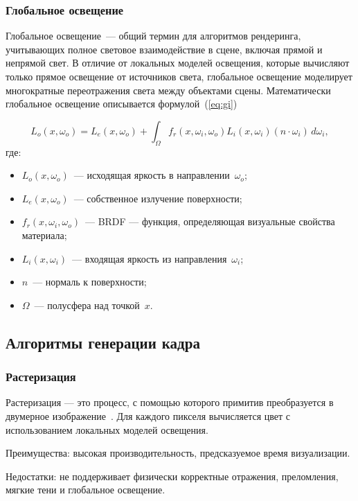 \subsubsection{Глобальное освещение}

Глобальное освещение~--- общий термин для алгоритмов рендеринга,
учитывающих полное световое взаимодействие в сцене,
включая прямой и непрямой свет.
В отличие от локальных моделей освещения, которые вычисляют только прямое освещение от источников света, глобальное освещение моделирует многократные переотражения света между объектами сцены.
Математически~\cite{GI-formula} глобальное освещение описывается формулой~(\ref{eq:gi})

\begin{equation}
    \label{eq:gi}
L_o(x, \omega_o) = L_e(x, \omega_o) + \int_{\Omega} f_r(x, \omega_i, \omega_o) L_i(x, \omega_i) (n \cdot \omega_i) \, d\omega_i,
\end{equation}
\noindent где:
\begin{itemize}
    \item $L_o(x, \omega_o)$~--- исходящая яркость в направлении~$\omega_o$;
    \item $L_e(x, \omega_o)$~--- собственное излучение поверхности;
    \item $f_r(x, \omega_i, \omega_o)$~--- BRDF --- функция, определяющая визуальные свойства материала;
    \item $L_i(x, \omega_i)$~--- входящая яркость из направления~$\omega_i$;
    \item $n$~--- нормаль к поверхности;
    \item $\Omega$~--- полусфера над точкой~$x$.
\end{itemize}

\subsection{Алгоритмы генерации кадра}
\subsubsection{Растеризация}

Растеризация --- это процесс, с помощью которого примитив преобразуется в двумерное изображение~\cite{rastr-microsoft}.
Для каждого пикселя вычисляется цвет с использованием локальных моделей освещения.

Преимущества: высокая производительность, предсказуемое время визуализации.

Недостатки: не поддерживает физически корректные отражения, преломления, мягкие тени и глобальное освещение.

